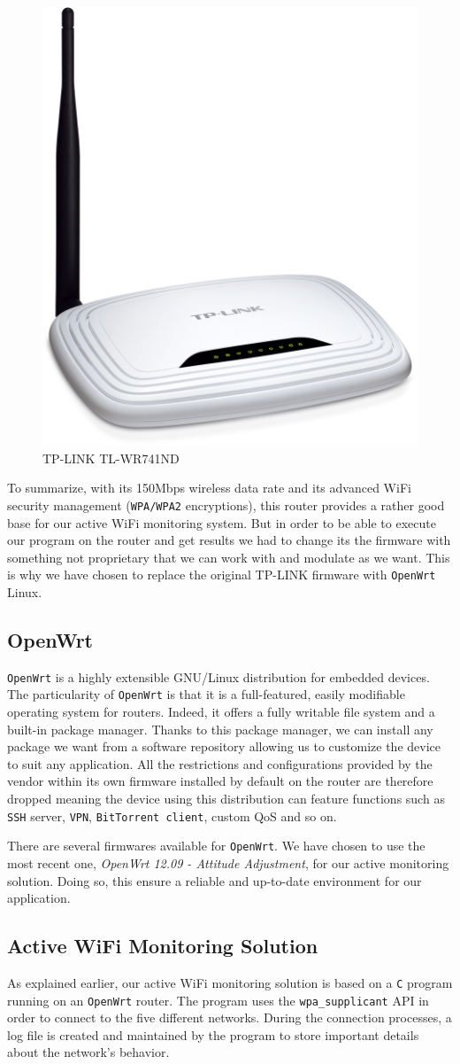\begin{figure}[H]
	\begin{center}
		\includegraphics[width=0.2\linewidth]{Pictures/chapter4/router.jpg}
		\caption{TP-LINK TL-WR741ND}
	\end{center}
\end{figure}

To summarize, with its 150Mbps wireless data rate and its advanced WiFi security management (\texttt{WPA/WPA2} encryptions), this router provides a rather good base for our active WiFi monitoring system. But in order to be able to execute our program on the router and get results we had to change its the firmware with something not proprietary that we can work with and modulate as we want. This is why we have chosen to replace the original TP-LINK firmware with \texttt{OpenWrt} Linux.


\subsection{OpenWrt}
\texttt{OpenWrt} \cite{openwrt} is a highly extensible GNU/Linux distribution for embedded devices. The particularity of \texttt{OpenWrt} is that it is a full-featured, easily modifiable operating system for routers. Indeed, it offers a fully writable file system and a built-in package manager. Thanks to this package manager, we can install any package we want from a software repository allowing us to customize the device to suit any application. All the restrictions and configurations provided by the vendor within its own firmware installed by default on the router are therefore dropped meaning the device using this distribution can feature functions such as \texttt{SSH} server, \texttt{VPN}, \texttt{BitTorrent client}, custom QoS and so on.

There are several firmwares available for \texttt{OpenWrt}. We have chosen to use the most recent one, \textit{OpenWrt 12.09 - Attitude Adjustment}, for our active monitoring solution. Doing so, this ensure a reliable and up-to-date environment for our application.


\subsection{Active WiFi Monitoring Solution}
As explained earlier, our active WiFi monitoring solution is based on a \texttt{C} program running on an \texttt{OpenWrt} router. The program uses the \texttt{wpa\_supplicant} API in order to connect to the five different networks. During the connection processes, a log file is created and maintained by the program to store important details about the network's behavior. 

